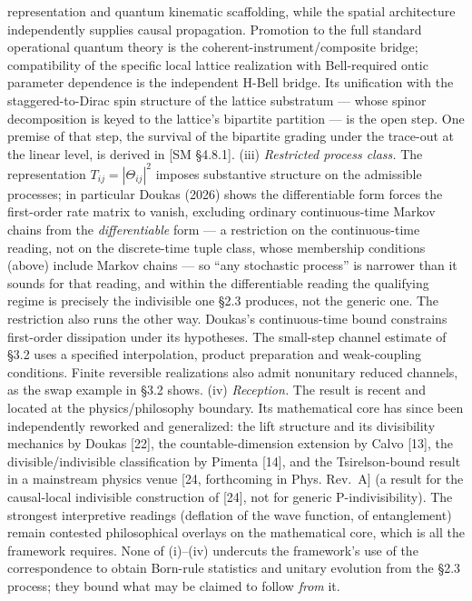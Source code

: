 \documentclass[
]{article}
\begin{document}
representation and quantum kinematic scaffolding, while the spatial
architecture independently supplies causal propagation. Promotion to the
full standard operational quantum theory is the
coherent-instrument/composite bridge; compatibility of the specific
local lattice realization with Bell-required ontic parameter dependence
is the independent H-Bell bridge. Its unification with the
staggered-to-Dirac spin structure of the lattice substratum --- whose
spinor decomposition is keyed to the lattice's bipartite partition ---
is the open step. One premise of that step, the survival of the
bipartite grading under the trace-out at the linear level, is derived in
{[}SM §4.8.1{]}. (iii) \emph{Restricted process class.} The
representation \(T_{ij}=|\Theta_{ij}|^2\) imposes substantive structure
on the admissible processes; in particular Doukas (2026) shows the
differentiable form forces the first-order rate matrix to vanish,
excluding ordinary continuous-time Markov chains from the
\emph{differentiable} form --- a restriction on the continuous-time
reading, not on the discrete-time tuple class, whose membership
conditions (above) include Markov chains --- so ``any stochastic
process'' is narrower than it sounds for that reading, and within the
differentiable reading the qualifying regime is precisely the
indivisible one §2.3 produces, not the generic one. The restriction also
runs the other way. Doukas's continuous-time bound constrains
first-order dissipation under its hypotheses. The small-step channel
estimate of §3.2 uses a specified interpolation, product preparation and
weak-coupling conditions. Finite reversible realizations also admit
nonunitary reduced channels, as the swap example in §3.2 shows. (iv)
\emph{Reception.} The result is recent and located at the
physics/philosophy boundary. Its mathematical core has since been
independently reworked and generalized: the lift structure and its
divisibility mechanics by Doukas {[}22{]}, the countable-dimension
extension by Calvo {[}13{]}, the divisible/indivisible classification by
Pimenta {[}14{]}, and the Tsirelson-bound result in a mainstream physics
venue {[}24, forthcoming in Phys. Rev.~A{]} (a result for the
causal-local indivisible construction of {[}24{]}, not for generic
P-indivisibility). The strongest interpretive readings (deflation of the
wave function, of entanglement) remain contested philosophical overlays
on the mathematical core, which is all the framework requires. None of
(i)--(iv) undercuts the framework's use of the correspondence to obtain
Born-rule statistics and unitary evolution from the §2.3 process; they
bound what may be claimed to follow \emph{from} it.
\end{document}
